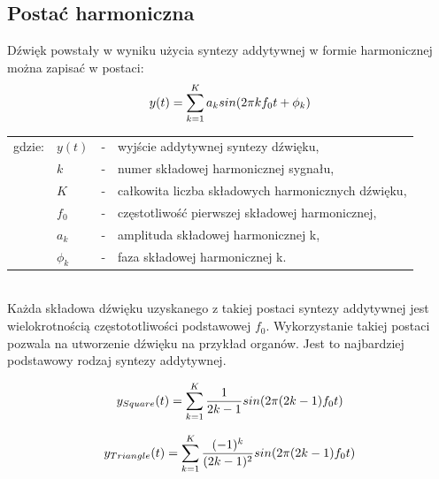 \subsection{Postać harmoniczna} \label{pos_harm}
Dźwięk powstały w wyniku użycia syntezy addytywnej w formie harmonicznej można zapisać w postaci:
\begin{equation} \label{equ:addit_time_harm}
y(t) = \sum_{k=1}^{K} a_{k}sin(2\pi kf_{0}t + \phi_{k})  \\  
\end{equation}
\begin{tabular}{ l l l l}
	gdzie: & $y(t)$ &  - & wyjście addytywnej syntezy dźwięku, \\
	&	$k$ & - &  numer składowej harmonicznej sygnału, \\
	&	$K$ & - &  całkowita liczba składowych harmonicznych dźwięku,\\
	&	$f_{0}$ & - &  częstotliwość pierwszej składowej harmonicznej,\\
	&	$a_{k}$ & - &  amplituda składowej harmonicznej k, \\
	&	$\phi_{k}$ & - &  faza składowej harmonicznej k. \\
\end{tabular} \\

Każda składowa dźwięku uzyskanego z takiej postaci syntezy addytywnej jest wielokrotnością częstototliwości podstawowej $f_{0}$. Wykorzystanie takiej postaci pozwala na utworzenie dźwięku na przykład organów. Jest to najbardziej podstawowy rodzaj syntezy addytywnej.


\begin{equation} \label{equ:addit_sqr}
y_{Square}(t) = \sum_{k=1}^{K} \frac{1}{2k-1} sin(2\pi (2k-1)f_{0}t) \\
\end{equation}

\begin{equation} \label{equ:addit_trng}
y_{Triangle}(t) = \sum_{k=1}^{K} \frac{(-1)^k}{(2k-1)^2} sin(2\pi (2k-1)f_{0}t)  \\
\end{equation}

